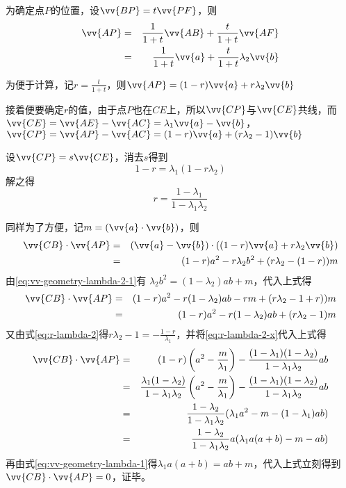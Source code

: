 为确定点$P$的位置，设$\vv{B P} = t \vv{P F}$，则
\begin{eqnarray}
\vv{A P} & = & \frac{1}{1 + t} \vv{A B} + \frac{t}{1 + t} \vv{A F} \\
& = & \frac{1}{1 + t} \vv{a} + \frac{t}{1 + t} \lambda_2 \vv{b}
\end{eqnarray}

为便于计算，记$r = \frac{t}{1 + t}$，则$\vv{A P} = (1 - r) \vv{a} + r \lambda_2 \vv{b}$ 

接着便要确定$r$的值，由于点$P$也在$C E$上，所以$\vv{C P}$与$\vv{C E}$共线，而 $\vv{C E} = \vv{A E} - \vv{A C} = \lambda_1 \vv{a} - \vv{b}$，$\vv{C P} = \vv{A P} - \vv{A C} = (1 - r) \vv{a} + (r \lambda_2 - 1) \vv{b}$

设$\vv{C P} = s \vv{C E}$，消去$s$得到
\begin{equation}
  \label{eq:r-lambda-2}
 1 - r = \lambda_1 (1 - r \lambda_2) 
\end{equation}
解之得
\begin{equation}
  \label{eq:r-lambda-2-x}
r = \frac{1 - \lambda_1}{1 - \lambda_1 \lambda_2}
\end{equation}

同样为了方便，记$m = (\vv{a} \cdot \vv{b})$，则
\begin{eqnarray*}
  \vv{C B} \cdot \vv{A P} & = & (\vv{a} - \vv{b})
  \cdot ((1 - r) \vv{a} + r \lambda_2 \vv{b})\\
  & = & (1 - r) a^2 - r \lambda_2 b^2 + (r \lambda_2 - (1 - r)) m
\end{eqnarray*}
由\ref{eq:vv-geometry-lambda-2-1}有 $\lambda_2 b^2 = (1 - \lambda_2) a b + m$，代入上式得
\begin{eqnarray*}
  \vv{C B} \cdot \vv{A P} & = & (1 - r) a^2 - r (1 -
  \lambda_2) a b - r m + (r \lambda_2 -  1 + r)) m\\
  & = & (1 - r) a^2 - r (1 - \lambda_2) a b + (r \lambda_2 -  1) m
\end{eqnarray*}
又由式\ref{eq:r-lambda-2}得$r \lambda_2 - 1 = - \frac{1 - r}{\lambda_1}$，并将\ref{eq:r-lambda-2-x}代入上式得
\begin{eqnarray*}
  \vv{C B} \cdot \vv{A P} & = & (1 - r) \left( a^2 -
  \frac{m}{\lambda_1} \right) - \frac{(1 - \lambda_1) (1 - \lambda_2)}{1 -
  \lambda_1 \lambda_2} a b\\
  & = & \frac{\lambda_1 (1 - \lambda_2)}{1 - \lambda_1 \lambda_2} \left( a^2
  - \frac{m}{\lambda_1} \right) - \frac{(1 - \lambda_1) (1 - \lambda_2)}{1 -
  \lambda_1 \lambda_2} a b\\
  & = & \frac{1 - \lambda_2}{1 - \lambda_1 \lambda_2} (\lambda_1 a^2 - m - (1
  - \lambda_1) a b)\\
  & = & \frac{1 - \lambda_2}{1 - \lambda_1 \lambda_2} a (\lambda_1 a (a + b)
  - m - a b)
\end{eqnarray*}
再由式\ref{eq:vv-geometry-lambda-1}得$\lambda_1 a (a + b) = a b + m$，代入上式立刻得到
$\vv{C B} \cdot \vv{A P} = 0$，证毕。





